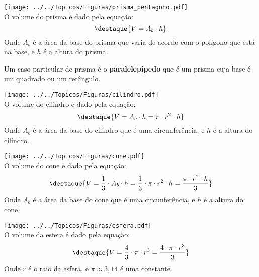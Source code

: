 \begin{multicols}{2}
 \texttt{[image: ../../Topicos/Figuras/prisma\_pentagono.pdf]} \\
 O volume do prisma é dado pela equação:
 \[\destaque{V= A_b \cdot h }\]
 Onde $A_b$ é a área da base do prisma que varia de acordo com o polígono que está na base, e $h$ é a altura do prisma.

 Um caso particular de prisma é o \textbf{paralelepípedo} que é um prisma cuja base é um quadrado ou um retângulo.
\end{multicols}

\begin{multicols}{2}
 \texttt{[image: ../../Topicos/Figuras/cilindro.pdf]} \\
 O volume do cilindro é dado pela equação:
 \[\destaque{V= A_b \cdot h= \pi \cdot r^2 \cdot h }\]
 Onde $A_b$ é a área da base do cilindro que é uma circunferência, e $h$ é a altura do cilindro.
\end{multicols}

\begin{multicols}{2}
 \texttt{[image: ../../Topicos/Figuras/cone.pdf]} \\

 O volume do cone é dado pela equação:
 \[\destaque{V= \frac{1}{3} \cdot A_b \cdot h= \frac{1}{3} \cdot \pi \cdot r^2 \cdot h = \frac{\pi \cdot r^2 \cdot h}{3}}\]
 Onde $A_b$ é a área da base do cone que é uma circunferência, e $h$ é a altura do cone.
\end{multicols}

\begin{multicols}{2}
 \texttt{[image: ../../Topicos/Figuras/esfera.pdf]} \\

 O volume da esfera é dado pela equação:
 \[\destaque{V= \frac{4}{3} \cdot \pi \cdot r^3= \frac{4 \cdot \pi \cdot r^3}{3}}\]
 Onde $r$ é o raio da esfera, e $\pi \approx 3,14$ é uma constante.
\end{multicols}

\newpage
